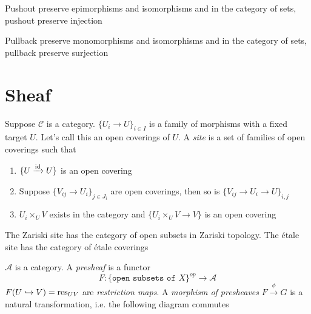 \documentclass[main]{subfiles}
\begin{document}
\begin{proposition}
Pushout preserve epimorphisms and isomorphisms and in the category of sets, pushout preserve injection \par
Pullback preserve monomorphisms and isomorphisms and in the category of sets, pullback preserve surjection
\end{proposition}

\section{Sheaf}

\begin{definition}
Suppose $\mathcal C$ is a category. $\{U_i\to U\}_{i\in I}$ is a family of morphisms with a fixed target $U$. Let's call this an open coverings of $U$. A \textit{site} is a set of families of open coverings such that
\begin{enumerate}
\item $\{U\xrightarrow{\operatorname{id}} U\}$ is an open covering
\item Suppose $\{V_{ij}\to U_i\}_{j\in J_i}$ are open coverings, then so is $\{V_{ij}\to U_i\to U\}_{i,j}$
\item $U_i\times_{U}V$ exists in the category and $\{U_i\times_{U}V\to V\}$ is an open covering
\begin{center}
\end{center}
\end{enumerate}
\end{definition}

\begin{definition}
The Zariski site has the category of open subsets in Zariski topology. The \'etale site has the category of \'etale coverings
\end{definition}

\begin{definition}
$\mathscr A$ is a category. A \textit{presheaf} is a functor
\[F:\{\texttt{open subsets of }X\}^{op}\to\mathscr A\]
$F(U\hookrightarrow V)=\operatorname{res}_{UV}$ are \textit{restriction maps}. A \textit{morphism of presheaves} $F\xrightarrow{\phi} G$ is a natural transformation, i.e. the following diagram commutes
\begin{center}
\end{center}
\end{definition}
\end{document}
